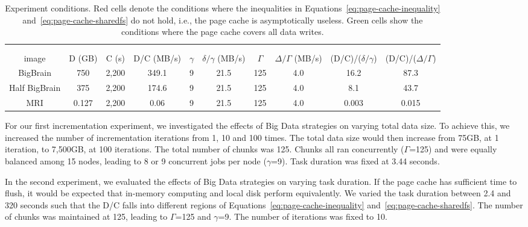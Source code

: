 \begin{table}
{\begin{tabular}{c|ccc|cccc|cc}
\hline
  \multicolumn{10}{c}{}\\ 
 \rowcolor{headcolor}
  \multicolumn{10}{c}{Experiment 4: Image Size}\\
  \hline
  \rowcolor{headcolor}
 image  &
 D (GB) & C (s) & D/C (MB/s) &
 $\gamma$ & $\delta/\gamma$ (MB/s) & $\Gamma$ & $\Delta/\Gamma$ (MB/s)&
(D/C)/($\delta/\gamma$) & (D/C)/($\Delta/\Gamma$)\\
 \hline
 BigBrain      & 750   & 2,200   & 349.1     & 9  & 21.5  & 125 & 4.0 &  \cellcolor{red!20} 16.2 & \cellcolor{red!20} 87.3   \\
 Half BigBrain & 375   & 2,200   & 174.6     & 9  & 21.5  & 125 & 4.0 &  \cellcolor{red!20} 8.1 & \cellcolor{red!20} 43.7   \\
 MRI           & 0.127 & 2,200   & 0.06      & 9  & 21.5  & 125 & 4.0 &  \cellcolor{green!20} 0.003 & \cellcolor{green!20} 0.015  
\end{tabular}
}
\caption{Experiment conditions. Red cells denote the conditions where 
the inequalities in Equations~\ref{eq:page-cache-inequality} 
and~\ref{eq:page-cache-sharedfs} do not hold, i.e., the page cache is 
asymptotically useless. Green cells show the conditions where the page cache covers all data writes.}
\label{table:experiments}
\end{table}

For our first incrementation experiment, we investigated the effects of 
Big Data strategies on varying total data size. To achieve this, we 
increased the number of incrementation iterations from 1, 10 and 100 
times. The total data size would then increase from 75GB, at 1 
iteration, to 7,500GB, at 100 iterations. The total number of chunks 
was 125. Chunks all ran concurrently ($\Gamma$=125) and were 
equally balanced among 15 nodes, leading to 8 or 9 concurrent jobs per 
node ($\gamma$=9). Task duration was fixed at 3.44 seconds.

In the second experiment, we evaluated the effects of Big Data 
strategies on varying task duration. If the page cache has sufficient 
time to flush, it would be expected that in-memory computing 
and local disk perform equivalently. We varied the task 
duration between 2.4 and 320 seconds such that the D/C falls into 
different regions of Equations~\ref{eq:page-cache-inequality} 
and~\ref{eq:page-cache-sharedfs}. The number of chunks was maintained 
at 125, leading to $\Gamma$=125 and $\gamma$=9. The number of iterations was
fixed to 10.

